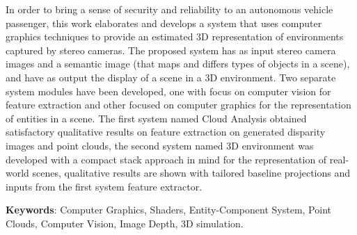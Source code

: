 \setlength{\absparsep}{18pt} %
\begin{resumo}

In order to bring a sense of security and reliability to an autonomous vehicle passenger, this work elaborates and develops a system that uses computer graphics techniques to provide an estimated 3D representation of environments captured by stereo cameras. The proposed system has as input stereo camera images and a semantic image (that maps and differs types of objects in a scene), and have as output the display of a scene in a 3D environment. Two separate system modules have been developed, one with focus on computer vision for feature extraction and other focused on computer graphics for the representation of entities in a scene. The first system named Cloud Analysis obtained satisfactory qualitative results on feature extraction on generated disparity images and point clouds, the second system named 3D environment was developed with a compact stack approach in mind for the representation of real-world scenes, qualitative results are shown with tailored baseline projections and inputs from the first system feature extractor.

\noindent\textbf{Keywords}: Computer Graphics, Shaders, Entity-Component System, Point Clouds, Computer Vision, Image Depth, 3D simulation.

\end{resumo}
